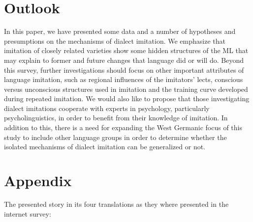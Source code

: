 \documentclass[output=paper]{LSP/langsci}
\begin{document}
 \section{Outlook}\label{outlook}

In this paper, we have presented some data and a number of hypotheses and presumptions on the mechanisms of dialect imitation. We emphasize that imitation of closely related varieties  show some hidden structures of the ML that may explain to former and future changes that language did or will do.  Beyond this survey, further investigations should focus on other important attributes of language imitation, such as regional influences of the imitators’ lects, conscious versus unconscious structures used in imitation and the training curve developed during repeated imitation. We would also like to propose that those investigating dialect imitations cooperate with experts in psychology, particularly psycholinguistics, in order to benefit from their knowledge of imitation. In addition to this, there is a need for expanding the West Germanic focus of this study to include other language groups in order to determine whether the isolated mechanisms of dialect imitation can be generalized or not.

\section{Appendix}\label{appendix}

The presented story in its four translations as they where presented in the internet survey:
\end{document}
